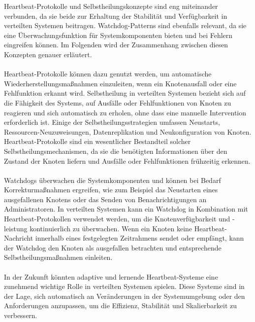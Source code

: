 \documentclass[../vs-script-first-v01.tex]{subfiles}
\begin{document}
Heartbeat-Protokolle und Selbstheilungskonzepte sind eng miteinander verbunden, da sie beide zur Erhaltung der Stabilität und Verfügbarkeit in verteilten Systemen beitragen. Watchdog-Patterns sind ebenfalls relevant, da sie eine Überwachungsfunktion für Systemkomponenten bieten und bei Fehlern eingreifen können. Im Folgenden wird der Zusammenhang zwischen diesen Konzepten genauer erläutert.
\\\\
Heartbeat-Protokolle können dazu genutzt werden, um automatische Wiederherstellungsmaßnahmen einzuleiten, wenn ein Knotenausfall oder eine Fehlfunktion erkannt wird. Selbstheilung in verteilten Systemen bezieht sich auf die Fähigkeit des Systems, auf Ausfälle oder Fehlfunktionen von Knoten zu reagieren und sich automatisch zu erholen, ohne dass eine manuelle Intervention erforderlich ist. Einige der Selbstheilungsstrategien umfassen Neustarts, Ressourcen-Neuzuweisungen, Datenreplikation und Neukonfiguration von Knoten. Heartbeat-Protokolle sind ein wesentlicher Bestandteil solcher Selbstheilungsmechanismen, da sie die benötigten Informationen über den Zustand der Knoten liefern und Ausfälle oder Fehlfunktionen frühzeitig erkennen.
\\\\
Watchdogs überwachen die Systemkomponenten und können bei Bedarf Korrekturmaßnahmen ergreifen, wie zum Beispiel das Neustarten eines ausgefallenen Knotens oder das Senden von Benachrichtigungen an Administratoren. In verteilten Systemen kann ein Watchdog in Kombination mit Heartbeat-Protokollen verwendet werden, um die Knotenverfügbarkeit und -leistung kontinuierlich zu überwachen. Wenn ein Knoten keine Heartbeat-Nachricht innerhalb eines festgelegten Zeitrahmens sendet oder empfängt, kann der Watchdog den Knoten als ausgefallen betrachten und entsprechende Selbstheilungsmaßnahmen einleiten.
\\\\
In der Zukunft könnten adaptive und lernende Heartbeat-Systeme eine zunehmend wichtige Rolle in verteilten Systemen spielen. Diese Systeme sind in der Lage, sich automatisch an Veränderungen in der Systemumgebung oder den Anforderungen anzupassen, um die Effizienz, Stabilität und Skalierbarkeit zu verbessern.
\end{document}
